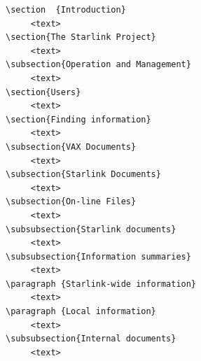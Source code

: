 \documentclass[11pt,twoside]{article}
\begin{document}
\begin{verbatim}
\section  {Introduction}
     <text>
\section{The Starlink Project}
     <text>
\subsection{Operation and Management}
     <text>
\section{Users}
     <text>
\section{Finding information}
     <text>
\subsection{VAX Documents}
     <text>
\subsection{Starlink Documents}
     <text>
\subsection{On-line Files}
     <text>
\subsubsection{Starlink documents}
     <text>
\subsubsection{Information summaries}
     <text>
\paragraph {Starlink-wide information}
     <text>
\paragraph {Local information}
     <text>
\subsubsection{Internal documents}
     <text>

\end{verbatim}
\end{document}
